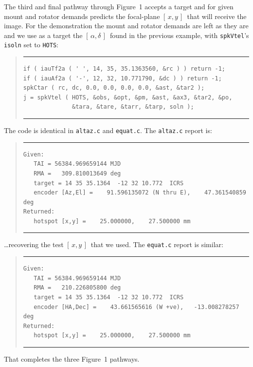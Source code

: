 \documentclass[11pt,fleqn,twoside,\paper]{article}
\renewcommand{\_}{{\tt\char'137}}     %
\newcommand{\radec}     {$[\,\alpha,\delta\,]$}
\newcommand{\xy}        {$[\,x,y\,]$}
\newcommand{\scode}     {\goodbreak
                         \begin{quote}
                         \vspace{-6ex}
                         \rule[-2ex]{36em}{0.03ex}}
\newcommand{\ecode}     {\rule[2ex]{36em}{0.03ex}
                         \end{quote}
                         \vspace{-4ex}
                         \goodbreak}
\begin{document}
The third and final pathway through Figure~1
accepts a target and for given mount and rotator demands
predicts the focal-plane \xy\ that will receive the image.
For the demonstration the mount and rotator demands
are left as they are and we use as a target the \radec\ found in the
previous example, with {\tt spkVtel}'s {\tt isoln} set to {\tt HOTS}:
\scode\begin{verbatim}
if ( iauTf2a ( ' ', 14, 35, 35.1363560, &rc ) ) return -1;
if ( iauAf2a ( '-', 12, 32, 10.771790, &dc ) ) return -1;
spkCtar ( rc, dc, 0.0, 0.0, 0.0, 0.0, &ast, &tar2 );
j = spkVtel ( HOTS, &obs, &opt, &pm, &ast, &ax3, &tar2, &po,
              &tara, &tare, &tarr, &tarp, soln );
\end{verbatim}\ecode
The code is identical in {\tt altaz.c} and {\tt equat.c}.  The
{\tt altaz.c} report is:
\scode\begin{verbatim}
Given:
   TAI = 56384.969659144 MJD
   RMA =   309.810013649 deg
   target = 14 35 35.1364  -12 32 10.772  ICRS
   encoder [Az,El] =    91.596135072 (N thru E),    47.361540859 deg
Returned:
   hotspot [x,y] =    25.000000,    27.500000 mm
\end{verbatim}\ecode
\ldots recovering the test \xy\ that we used.  The {\tt equat.c}
report is similar:
\scode\begin{verbatim}
Given:
   TAI = 56384.969659144 MJD
   RMA =   210.226805800 deg
   target = 14 35 35.1364  -12 32 10.772  ICRS
   encoder [HA,Dec] =    43.661565616 (W +ve),   -13.008278257 deg
Returned:
   hotspot [x,y] =    25.000000,    27.500000 mm
\end{verbatim}\ecode
That completes the three Figure~1 pathways.
\end{document}
